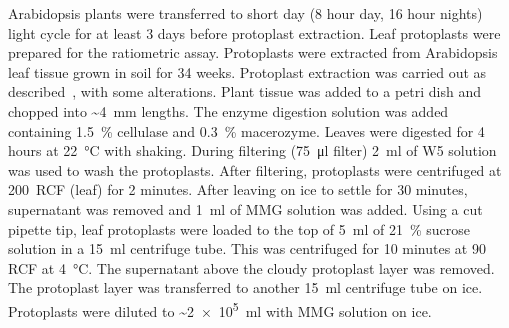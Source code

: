 \documentclass[../main.tex]{subfiles}
\begin{document}
Arabidopsis plants were transferred to short day (8 hour day, 16 hour nights) light cycle for at least 3 days before protoplast extraction.
Leaf protoplasts were prepared for the ratiometric assay.
Protoplasts were extracted from Arabidopsis leaf tissue grown in soil for 3\textendash{}4 weeks.
Protoplast extraction was carried out as described~\autocite{yooArabidopsisMesophyllProtoplasts2007}, with some alterations.
Plant tissue was added to a petri dish and chopped into \textasciitilde{}\SI{4}{\mm} lengths.
The enzyme digestion solution was added containing \SI{1.5}{\percent} cellulase and \SI{0.3}{\percent} macerozyme.
Leaves were digested for 4 hours at \SI{22}{\degreeCelsius} with shaking.
During filtering (\SI{75}{\micro\litre} filter) \SI{2}{\ml} of W5 solution was used to wash the protoplasts.
After filtering, protoplasts were centrifuged at 200~RCF (leaf) for 2 minutes.
After leaving on ice to settle for 30 minutes, supernatant was removed and \SI{1}{\ml} of MMG solution was added.
Using a cut pipette tip, leaf protoplasts were loaded to the top of \SI{5}{\ml} of \SI{21}{\percent} sucrose solution in a \SI{15}{\ml} centrifuge tube.
This was centrifuged for 10 minutes at 90 RCF at \SI{4}{\degreeCelsius}.
The supernatant above the cloudy protoplast layer was removed.
The protoplast layer was transferred to another \SI{15}{\ml} centrifuge tube on ice.
Protoplasts were diluted to \textasciitilde{}\SI{2e5}{\ml} with MMG solution on ice.
\end{document}
